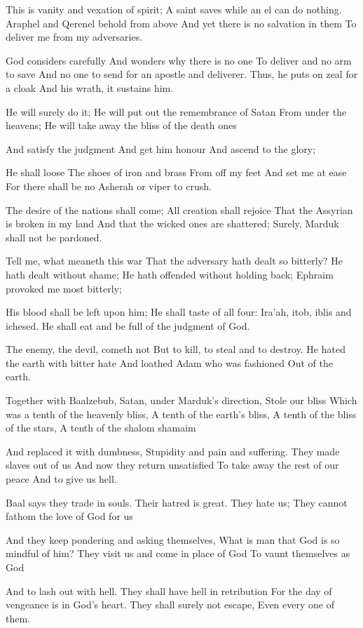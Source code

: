 \documentclass[
]{book}
\begin{document}
This is vanity and vexation of spirit;
A saint saves while an el can do nothing.
Araphel and Qerenel behold from above
And yet there is no salvation in them
To deliver me from my adversaries.

God considers carefully
And wonders why there is no one
To deliver and no arm to save
And no one to send for an apostle and deliverer.
Thus, he puts on zeal for a cloak
And his wrath, it sustains him.

He will surely do it;
He will put out the remembrance of Satan
From under the heavens;
He will take away the bliss of the death ones

And satisfy the judgment
And get him honour
And ascend to the glory;

He shall loose
The shoes of iron and brass
From off my feet
And set me at ease
For there shall be no Asherah or viper to crush.

The desire of the nations shall come;
All creation shall rejoice
That the Assyrian is broken in my land
And that the wicked ones are shattered;
Surely, Marduk shall not be pardoned.

Tell me, what meaneth this war
That the adversary hath dealt so bitterly?
He hath dealt without shame;
He hath offended without holding back;
Ephraim provoked me most bitterly;

His blood shall be left upon him;
He shall taste of all four:
Ira'ah, itob, iblis and ichesed.
He shall eat and be full of the judgment of God.

The enemy, the devil, cometh not
But to kill, to steal and to destroy.
He hated the earth with bitter hate
And loathed Adam who was fashioned
Out of the earth.

Together with Baalzebub,
Satan, under Marduk's direction,
Stole our bliss
Which was a tenth of the heavenly bliss,
A tenth of the earth's bliss,
A tenth of the bliss of the stars,
A tenth of the shalom shamaim

And replaced it with dumbness,
Stupidity and pain and suffering.
They made slaves out of us
And now they return unsatisfied
To take away the rest of our peace
And to give us hell.

Baal says they trade in souls.
Their hatred is great.
They hate us;
They cannot fathom the love of God for us

And they keep pondering and asking themselves,
What is man that God is so mindful of him?
They visit us and come in place of God
To vaunt themselves as God

And to lash out with hell.
They shall have hell in retribution
For the day of vengeance is in God's heart.
They shall surely not escape,
Even every one of them.
\end{document}
